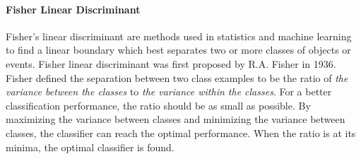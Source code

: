 \paragraph{Fisher Linear Discriminant}
Fisher's linear discriminant are methods used in statistics and machine learning to find a linear boundary which best separates two or more classes of objects or events. Fisher linear discriminant was first proposed by R.A. Fisher \cite{Fisher1936} in 1936. Fisher defined the separation between two class examples to be the ratio of \textit{the variance between the classes} to \textit{the variance within the classes}. For a better classification performance, the ratio should be as small as possible. By maximizing the variance between classes and minimizing the variance between classes, the classifier can reach the optimal performance. When the ratio is at its minima, the optimal classifier is found.

